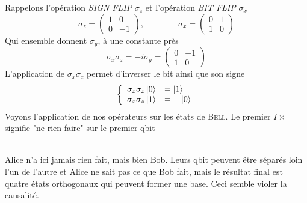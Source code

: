 Rappelons l'opération \textit{SIGN FLIP} $\sigma_z$ et l'opération \textit{BIT FLIP}
$\sigma_x$
\begin{equation}
\sigma_z = \left(\begin{array}{cc}
1&0\\
0&-1
\end{array}\right),\qquad\qquad
\sigma_x = \left(\begin{array}{cc}
0&1\\
1&0
\end{array}\right)
\end{equation}
Qui ensemble donnent $\sigma_y$, à une constante près
\begin{equation}
\sigma_x\sigma_z = -i\sigma_y = \left(\begin{array}{cc}
0&-1\\
1&0
\end{array}\right)
\end{equation}
L'application de $\sigma_x\sigma_z$ permet d'inverser le bit ainsi que son signe
\begin{equation}
\left\{\begin{array}{ll}
\sigma_x\sigma_z\ket0 &=\ket1\\
\sigma_x\sigma_z\ket1 &=-\ket0
\end{array}\right.
\end{equation}
Voyons l'application de nos opérateurs sur les états de \textsc{Bell}. Le premier $I\times$
signifie "ne rien faire" sur le premier qbit\\

\ 

Alice n'a ici jamais rien fait, mais bien Bob. Leurs qbit peuvent être séparés loin l'un de l'autre
et Alice ne sait pas ce que Bob fait, mais le résultat final est quatre états orthogonaux qui peuvent
former une base. Ceci semble violer la causalité.\\

